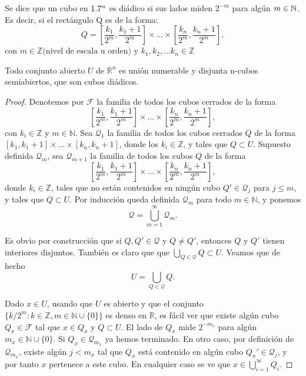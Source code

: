 \begin{definición}
Se dice que un cubo en $1.7^n$ es diádico si sus lados miden $2^{-m}$ para algún $m \in \mathbb{N}$.
Es decir, si el rectángulo Q es de la forma:
\[Q = \left[\frac{k_1}{2^m}, \frac{k_1 + 1}{2^m}\right] \times \dots \times \left[\frac{k_n}{2^m}, \frac{k_n + 1}{2^m}\right],\]
con $m \in \mathbb{Z} \text{(nivel de escala u orden) y } k_1, k_2, \dots k_n
    \in \mathbb{Z}$
\end{definición}

\begin{teorema}
    Todo conjunto abierto $U$ de $\mathbb{R}^n$ es unión numerable y disjunta n-cubos semiabiertos, que son cubos diádicos.
\end{teorema}

\begin{proof}
    Denotemos por $\mathcal{F}$ la familia de todos los cubos cerrados de la forma
    \[
        \left[\frac{k_1}{2^m}, \frac{k_1 + 1}{2^m}\right] \times \dots \times \left[\frac{k_n}{2^m}, \frac{k_n + 1}{2^m}\right],
    \]
    con $k_i \in \mathbb{Z}$ y $m \in \mathbb{N}$. Sea $\mathcal{Q}_1$ la familia
    de todos los cubos cerrados $Q$ de la forma $[k_1, k_1 + 1] \times \dots \times
        [k_n, k_n + 1]$, donde los $k_i \in \mathbb{Z}$, y tales que $Q \subset U$.
    Supuesto definida $\mathcal{Q}_m$, sea $\mathcal{Q}_{m+1}$ la familia de todos
    los cubos $Q$ de la forma
    \[
        \left[\frac{k_1}{2^m}, \frac{k_1+1}{2^m}\right] \times \dots \times \left[\frac{k_n}{2^m}, \frac{k_n+1}{2^m}\right],
    \]
    donde $k_i \in \mathbb{Z}$, tales que no están contenidos en ningún cubo $Q'
        \in \mathcal{Q}_j$ para $j \leq m$, y tales que $Q \subset U$. Por inducción
    queda definida $\mathcal{Q}_m$ para todo $m \in \mathbb{N}$, y ponemos
    \[
        \mathcal{Q} = \bigcup_{m=1}^{\infty} \mathcal{Q}_m.
    \]

    Es obvio por construcción que si $Q, Q' \in \mathcal{Q}$ y $Q \neq Q'$,
    entonces $Q$ y $Q'$ tienen interiores disjuntos. También es claro que que
    $\bigcup_{Q \in \mathcal{Q}} Q \subset U$. Veamos que de hecho
    \[
        U = \bigcup_{Q \in \mathcal{Q}} Q.
    \]

    Dado $x \in U$, usando que $U$ es abierto y que el conjunto $\{k/2^m : k \in
        \mathbb{Z}, m \in \mathbb{N} \cup \{0\}\}$ es denso en $\mathbb{R}$, es fácil
    ver que existe algún cubo $Q_x \in \mathcal{F}$ tal que $x \in Q_x$ y $Q
        \subset U$. El lado de $Q_x$ mide $2^{-m_x}$ para algún $m_x \in \mathbb{N}
        \cup \{0\}$. Si $Q_x \in \mathcal{Q}_{m_x}$ ya hemos terminado. En otro caso,
    por definición de $\mathcal{Q}_{m_x}$, existe algún $j < m_x$ tal que $Q_x$
    está contenido en algún cubo $Q_x' \in \mathcal{Q}_j$, y por tanto $x$
    pertenece a este cubo. En cualquier caso se ve que $x \in
        \bigcup_{i=1}^{\infty} Q_i$.
\end{proof}

